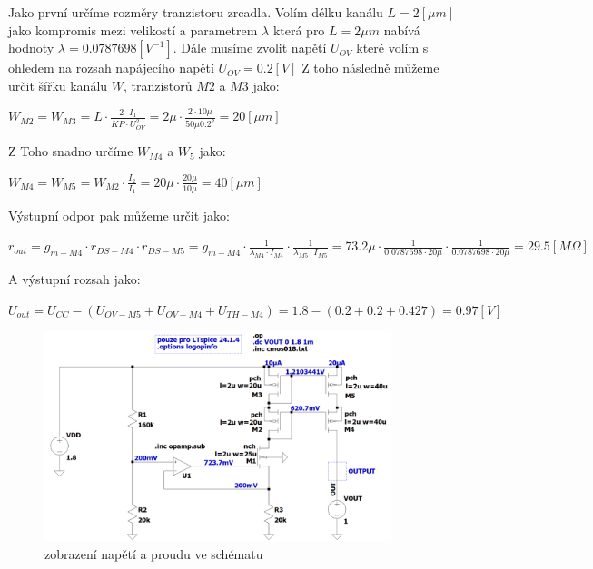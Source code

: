 Jako první určíme rozměry tranzistoru zrcadla.
Volím délku kanálu \(L = 2 [\mu m]\) jako kompromis mezi velikostí a parametrem \(\lambda\) která pro \(L = 2 \mu m\) nabívá hodnoty \(\lambda = 0.0787698 [V^{-1}]\).
Dále musíme zvolit napětí \(U_{OV}\) které volím s ohledem na rozsah napájecího napětí \(U_{OV} = 0.2 [V]\)
Z toho následně můžeme určit šířku kanálu \(W\), tranzistorů \(M2\) a \(M3\) jako:

\begin{center}
    \large
    \(
        W_{M2} = W_{M3} = L \cdot \frac{2 \cdot I_1}{KP \cdot U_{OV}^2} = 2\mu \cdot \frac{2 \cdot 10\mu}{50\mu 0.2^2} = 20 [\mu m]
    \)
\end{center}

Z Toho snadno určíme \(W_{M4}\) a \(W_{5}\) jako:

\begin{center}
    \large
    \(
        W_{M4} = W_{M5} = W_{M2} \cdot \frac{I_2}{I_1} = 20\mu \cdot \frac{20\mu}{10\mu} = 40 [\mu m]
    \)
\end{center}

Výstupní odpor pak můžeme určit jako:

\begin{center}
    \large
    \(
        r_{out} = g_{m-M4} \cdot r_{DS-M4} \cdot r_{DS-M5} = g_{m-M4} \cdot \frac{1}{\lambda_{M4}\cdot I_{M4}} \cdot \frac{1}{\lambda_{M5}\cdot I_{M5}} = 73.2\mu \cdot \frac{1}{0.0787698 \cdot 20\mu} \cdot \frac{1}{0.0787698 \cdot 20\mu} = 29.5 [M \Omega]
    \)
\end{center}

A výstupní rozsah jako:

\begin{center}
    \large
    \(
        U_{out} = U_{CC} - (U_{OV-M5} + U_{OV-M4} + U_{TH-M4}) = 1.8 - (0.2+0.2+0.427) = 0.97 [V]
    \)
\end{center}

\vspace{10mm}
\begin{figure}[h!]
    \centering
    \includegraphics[width=0.9\textwidth]{text/img/KPZ-op-sch.png}
    \caption{\label{fig:KPZ-op-sch} zobrazení napětí a proudu ve schématu}
\end{figure}

